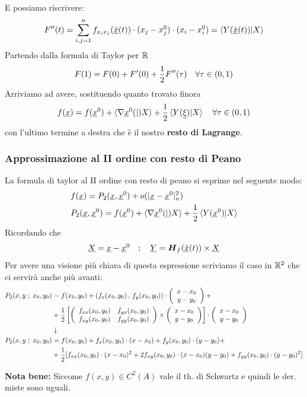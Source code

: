 E possiamo riscrivere:
\begin{align}
	F''(t)= \sum_{i,j=1}^{n} f_{x_i x_j} (\hat{\underline{x}}(t)) \cdot (x_j - x_j^0) \cdot (x_i - x_i^0) = \braket{Y(\hat{\underline{x}}(t))|X}
\end{align}
Partendo dalla formula di Taylor per $\mathbb{R}$
\begin{align}
	F(1)=F(0) + F'(0) + \frac{1}{2} F''(\tau) \quad \forall \tau \in (0,1)
\end{align}
Arriviamo ad avere, sostituendo quanto trovato finora
\begin{align}
	f(\underline{x})=f(\underline{x}^0) + \braket{\nabla \underline{x}^0(|)X} + \frac{1}{2} \braket{Y(\underline{\xi})|X} \quad \forall \tau \in (0,1)
\end{align}
con l'ultimo termine a destra che è il nostro \textbf{resto di Lagrange}.

\newpage

\subsubsection{Approssimazione al II ordine con resto di Peano}

La formula di taylor al II ordine con resto di peano si esprime nel seguente modo:
\begin{align}
	{}&f(\underline{x})= P_2(\underline{x},\underline{x}^0) + o(|\underline{x}- \underline{x}^0|_n^2)\\
	&P_2(\underline{x},\underline{x}^0)=f(\underline{x}^0) + \braket{\nabla \underline{x}^0(|)X} + \frac{1}{2} \braket{Y(\underline{x}^0)|X}
\end{align}
Ricordando che
\begin{align}
	\underline{X}=\underline{x}- \underline{x}^0 \quad ; \quad \underline{Y} =  \boldsymbol{H}_{f} (\hat{\underline{x}}(t))  \times \underline{X}
\end{align}
Per avere una visione più chiara di questa espressione scriviamo il caso in $\mathbb{R}^2$ che ci servirà anche più avanti:
\begin{align}
	P_2(x,y \; ; \; x_0,y_0){}&=f(x_0,y_0) + (f_x(x_0,y_0) \, , \, f_y(x_0,y_0)) \cdot \left( \begin{array}{cc} x-x_0 \\ y-y_0 \end{array} \right) + \nonumber \\
	&+ \frac{1}{2} \left[ \left( \begin{array}{ccc} f_{xx}(x_0,y_0) & f_{yx}(x_0,y_0) \\ f_{xy}(x_0,y_0) & f_{yy}(x_0,y_0) \end{array} \right)\times \left( \begin{array}{cc} x-x_0 \\ y-y_0 \end{array} \right) \right] \cdot \left( \begin{array}{cc} x-x_0 \\ y-y_0 \end{array} \right) \nonumber \\ &\downarrow \nonumber \\
	P_2(x,y \; ; \; x_0,y_0)&= f(x_0,y_0) + f_x(x_0,y_0)\cdot (x-x_0)  + f_y(x_0,y_0) \cdot (y-y_0) +  \nonumber \\
	& + \frac{1}{2} [f_{xx}(x_0,y_0)\cdot (x-x_0)^2 + 2f_{xy}(x_0,y_0)\cdot (x-x_0)(y-y_0) + f_{yy}(x_0,y_0)\cdot (y-y_0)^2]
\end{align}

\textbf{Nota bene:} Siccome $f(x,y)\in C^2(A)$ vale il th. di Schwartz e quindi le der. miste sono uguali.

